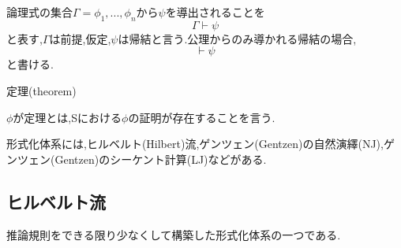論理式の集合$\Gamma={\phi_1,...,\phi_n}$から$\psi$を導出されることを
\begin{equation*}
 \Gamma \vdash \psi
\end{equation*}
と表す,$\Gamma$は前提,仮定,$\psi$は帰結と言う.公理からのみ導かれる帰結の場合,
\begin{equation*}
 \vdash \psi
\end{equation*}
と書ける.

\begin{dfn}
 定理(theorem)

 $\phi$が定理とは,Sにおける$\phi$の証明が存在することを言う.
\end{dfn}

形式化体系には,ヒルベルト(Hilbert)流,ゲンツェン(Gentzen)の自然演繹(NJ),ゲンツェン(Gentzen)のシーケント計算(LJ)などがある.
\subsection{ヒルベルト流}
推論規則をできる限り少なくして構築した形式化体系の一つである.

